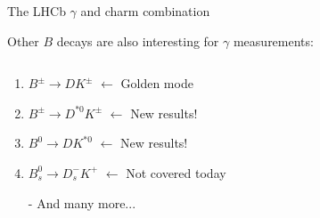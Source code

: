 \documentclass[dvipsnames]{beamer}
\begin{document}
\begin{frame}{The LHCb $\gamma$ and charm combination}
  \begin{center}
    \Large Other $B$ decays are also interesting for $\gamma$ measurements:
  \end{center}
  \vspace{0.2cm}
  \begin{columns}
    \begin{column}{0.6\textwidth}
      \vspace{1.5cm}
      \begin{enumerate}
        \item{$B^\pm\to DK^\pm$ $\leftarrow$ Golden mode}
        \item{$B^\pm\to D^{*0}K^\pm$ $\leftarrow$ New results!}
        \item{$B^0\to DK^{*0}$ $\leftarrow$ New results!}
        \item{$B_s^0\to D_s^-K^+$ $\leftarrow$ Not covered today}
        \item[-]{And many more...}
      \end{enumerate}
      \vspace{1.5cm}
    \end{column}
    \begin{column}{0.4\textwidth}
    \end{column}
  \end{columns}
\end{frame}
\end{document}
